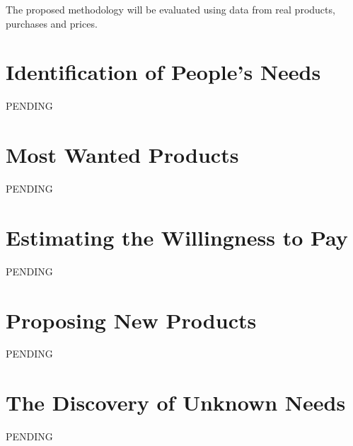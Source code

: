 The proposed methodology will be evaluated using data from real products, purchases and prices.

%
%

\section{Identification of People's Needs}

{\color{red} PENDING}

%
%

\section{Most Wanted Products}

{\color{red} PENDING}

%
%

\section{Estimating the Willingness to Pay}

{\color{red} PENDING}

%
%

\section{Proposing New Products}

{\color{red} PENDING}

%
%

\section{The Discovery of Unknown Needs}

{\color{red} PENDING}
